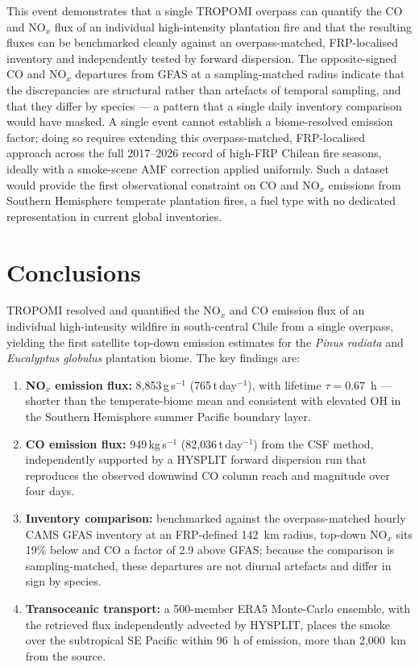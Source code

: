 \documentclass[draft]{agujournal2019}
\newcommand{\NOx}{NO$_x$}
\newcommand{\kgs}{\,kg\,s$^{-1}$}
\newcommand{\gs}{\,g\,s$^{-1}$}
\newcommand{\td}{\,t\,day$^{-1}$}
\begin{document}
This event demonstrates that a single TROPOMI overpass can quantify the CO and \NOx{} flux of an individual high-intensity plantation fire and that the resulting fluxes can be benchmarked cleanly against an overpass-matched, FRP-localised inventory and independently tested by forward dispersion. The opposite-signed CO and \NOx{} departures from GFAS at a sampling-matched radius indicate that the discrepancies are structural rather than artefacts of temporal sampling, and that they differ by species --- a pattern that a single daily inventory comparison would have masked. A single event cannot establish a biome-resolved emission factor; doing so requires extending this overpass-matched, FRP-localised approach across the full 2017--2026 record of high-FRP Chilean fire seasons, ideally with a smoke-scene AMF correction applied uniformly. Such a dataset would provide the first observational constraint on CO and \NOx{} emissions from Southern Hemisphere temperate plantation fires, a fuel type with no dedicated representation in current global inventories.

\section{Conclusions}
\label{sec:conclusions}

TROPOMI resolved and quantified the \NOx{} and CO emission flux of an individual high-intensity wildfire in south-central Chile from a single overpass, yielding the first satellite top-down emission estimates for the \textit{Pinus radiata} and \textit{Eucalyptus globulus} plantation biome. The key findings are:

\begin{enumerate}
  \item \textbf{\NOx{} emission flux:} 8{,}853\gs{} (765\td), with lifetime
        $\tau = 0.67$~h --- shorter than the temperate-biome mean and
        consistent with elevated OH in the Southern Hemisphere summer Pacific
        boundary layer.
  \item \textbf{CO emission flux:} 949\kgs{} (82{,}036\td) from the CSF
        method, independently supported by a HYSPLIT forward dispersion run
        that reproduces the observed downwind CO column reach and magnitude
        over four days.
  \item \textbf{Inventory comparison:} benchmarked against the overpass-matched
        hourly CAMS GFAS inventory at an FRP-defined 142~km radius, top-down
        \NOx{} sits 19\% below and CO a factor of 2.9 above GFAS; because the
        comparison is sampling-matched, these departures are not diurnal
        artefacts and differ in sign by species.
  \item \textbf{Transoceanic transport:} a 500-member ERA5 Monte-Carlo
        ensemble, with the retrieved flux independently advected by HYSPLIT,
        places the smoke over the subtropical SE Pacific within 96~h of
        emission, more than 2{,}000~km from the source.
\end{enumerate}
\end{document}

